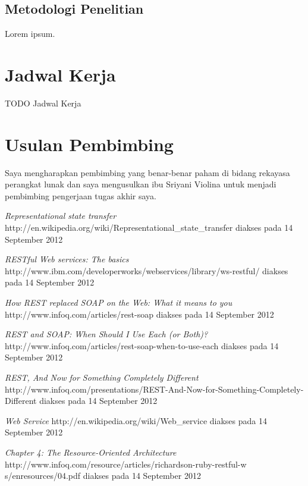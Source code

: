 \documentclass[a4paper, 12pt]{report}
\begin{document}
\subsection*{Metodologi Penelitian}
\begin{flushleft}
Lorem ipsum.
\end{flushleft}

\section*{Jadwal Kerja}
\begin{flushleft}
TODO Jadwal Kerja
\end{flushleft}

\section*{Usulan Pembimbing}
Saya mengharapkan pembimbing yang benar-benar paham di bidang rekayasa perangkat lunak dan saya mengusulkan ibu Sriyani Violina untuk menjadi pembimbing pengerjaan tugas akhir saya.\cite{lamport94}

\begin{thebibliography}{99}

  \emph{Representational state transfer}
  http://en.wikipedia.org/wiki/Representational\_state\_transfer
  diakses pada 14 September 2012

  \emph{RESTful Web services: The basics}
  http://www.ibm.com/developerworks/webservices/library/ws-restful/
  diakses pada 14 September 2012
  
  \emph{How REST replaced SOAP on the Web: What it means to you}
  http://www.infoq.com/articles/rest-soap
  diakses pada 14 September 2012
  
  \emph{REST and SOAP: When Should I Use Each (or Both)?}
  http://www.infoq.com/articles/rest-soap-when-to-use-each
  diakses pada 14 September 2012
  
  \emph{REST, And Now for Something Completely Different}
  http://www.infoq.com/presentations/REST-And-Now-for-Something-Completely-Different
  diakses pada 14 September 2012
  
  \emph{Web Service}
  http://en.wikipedia.org/wiki/Web\_service
  diakses pada 14 September 2012
  
  \emph{Chapter 4: The Resource-Oriented Architecture}
  http://www.infoq.com/resource/articles/richardson-ruby-restful-w  s/enresources/04.pdf
  diakses pada 14 September 2012

\end{thebibliography}
\end{document}
